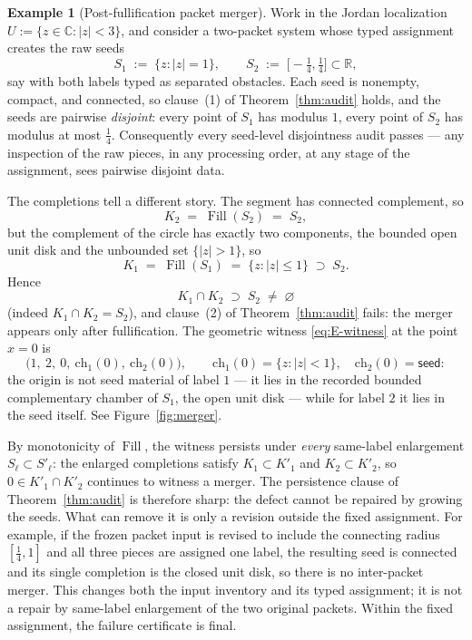 \documentclass[11pt,reqno]{amsart}
\theoremstyle{definition}
\newtheorem{example}[theorem]{Example}
\theoremstyle{remark}
\newcommand{\C}{\mathbb C}
\newcommand{\Fill}{\operatorname{Fill}}
\begin{document}
\begin{example}[Post-fullification packet merger]\label{ex:merger}
Work in the Jordan localization $U:=\{z\in\C:|z|<3\}$, and consider a two-packet
system whose typed assignment creates the raw seeds
\[
S_1\;:=\;\{z:|z|=1\},
\qquad
S_2\;:=\;\bigl[-\tfrac14,\tfrac14\bigr]\subset\mathbb R,
\]
say with both labels typed as separated obstacles.
Each seed is nonempty, compact, and connected, so clause~(1) of Theorem~\ref{thm:audit} holds,
and the seeds are pairwise \emph{disjoint}: every point of $S_1$ has modulus $1$,
every point of $S_2$ has modulus at most $\tfrac14$. Consequently every seed-level
disjointness audit passes --- any inspection of the raw pieces, in any processing
order, at any stage of the assignment, sees pairwise disjoint data.

The completions tell a different story. The segment has connected complement, so
\[
K_2\;=\;\Fill(S_2)\;=\;S_2 ,
\]
but the complement of the circle has exactly two components, the bounded open unit
disk and the unbounded set $\{|z|>1\}$, so
\[
K_1\;=\;\Fill(S_1)\;=\;\{z:|z|\le1\}\;\supset\;S_2 .
\]
Hence
\[
K_1\cap K_2\;\supset\;S_2\;\neq\;\varnothing
\]
(indeed $K_1\cap K_2=S_2$), and clause~(2) of Theorem~\ref{thm:audit} fails: the
merger appears only after fullification. The geometric witness \eqref{eq:E-witness}
at the point $x=0$ is
\[
\bigl(1,\ 2,\ 0,\ \mathrm{ch}_1(0),\ \mathrm{ch}_2(0)\bigr),
\qquad
\mathrm{ch}_1(0)=\{z:|z|<1\},
\quad
\mathrm{ch}_2(0)=\textsf{seed}:
\]
the origin is not seed material of label $1$ --- it lies in the recorded bounded
complementary chamber of $S_1$, the open unit disk --- while for label $2$ it lies in
the seed itself. See Figure~\ref{fig:merger}.

By monotonicity of $\Fill$, the witness persists under \emph{every} same-label
enlargement $S_\ell\subset S'_\ell$: the enlarged completions satisfy
$K_1\subset K'_1$ and $K_2\subset K'_2$, so $0\in K'_1\cap K'_2$ continues to
witness a merger. The persistence clause of Theorem~\ref{thm:audit} is therefore
sharp: the defect cannot be repaired by growing the seeds. What can remove it is
only a revision outside the fixed assignment.  For example, if the frozen
packet input is revised to include the connecting radius
$[\tfrac14,1]$ and all three pieces are assigned one label, the resulting
seed is connected and its single completion is the closed unit disk, so
there is no inter-packet merger.  This changes both the input inventory and
its typed assignment; it is not a repair by same-label enlargement of the
two original packets.  Within the fixed assignment, the failure
certificate is final.


\end{example}
\end{document}
